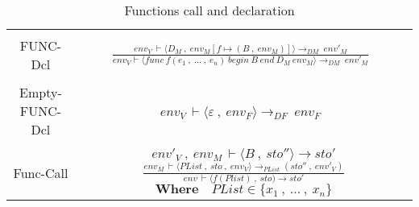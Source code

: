 \begin{table}[H]
    \begin{adjustbox}{center}
        \begin{tabular}{|c|c|}
        \hline
\vspace {0.1pt} &\\
FUNC-Dcl        &   \hbox{\huge \(\frac{env_V\, \vdash \langle D_M\: ,\  env_M [f \mapsto (B\: ,\  env_M)] \rangle \rightarrow_{DM}\: env'_M}{env_V \vdash \langle func\ f(e_1\: ,\ ...\: ,\ e_n)\ begin\ B\ end\ D_M \ env_M \rangle \rightarrow_{DM}\: env'_M}\) } \vspace{0.1pt} \\ \hline 
\vspace {0.1pt} & \\  

Empty-FUNC-Dcl        &   \hbox{\Large \(env_V\, \vdash \langle \varepsilon\: ,\ env_F \rangle \rightarrow_{DF}\: env_F\) } \vspace{0.1pt} \\ \hline 
\vspace {0.1pt} & \\  

Func-Call  & \pbox{20cm}{\large \(env'_V\: ,\ env_M\, \vdash \langle B\: ,\ sto'' \rangle \rightarrow sto'\) \\ \huge \(\frac{env_M\, \vdash \langle PList\: ,\ sto\: ,\ env_V \rangle \rightarrow_{PList}(sto''\: ,\ env'_V)}{env\, \vdash \langle f(Plist)\: ,\ sto)\rightarrow sto'}\) \normalsize \\ \\ \(\textbf{Where} \quad PList \in \{x_1\: ,\ ...\: ,\ x_n\} \) } \vspace{0.1pt}  \\ \hline

        \end{tabular}
    \end{adjustbox}
    
    \caption{Functions call and declaration}
    \label{fig:Func}
\end{table}


